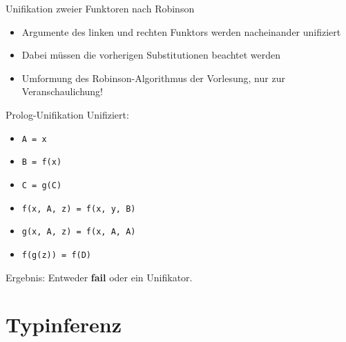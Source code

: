 \documentclass{beamer}
\newcommand{\code}[1]{
	\begin{mdframed}
		
	\end{mdframed}
}
\begin{document}
\begin{frame}{Unifikation zweier Funktoren nach Robinson}
	\code{code/robinson2.pseudo}

	\begin{itemize}
		\item Argumente des linken und rechten Funktors werden nacheinander unifiziert
		\item Dabei müssen die vorherigen Substitutionen beachtet werden
		\pause
		\item Umformung des Robinson-Algorithmus der Vorlesung, nur zur Veranschaulichung!
	\end{itemize}
\end{frame}

\begin{frame}{Prolog-Unifikation}
	Unifiziert:

	\begin{itemize}
		\item \texttt{A = x}
		\item \texttt{B = f(x)}
		\item \texttt{C = g(C)}
		\item \texttt{f(x, A, z) = f(x, y, B)}
		\item \texttt{g(x, A, z) = f(x, A, A)}
		\item \texttt{f(g(z)) = f(D)}
	\end{itemize}

	Ergebnis: Entweder \textbf{fail} oder ein Unifikator.
\end{frame}

\section{Typinferenz}

\newcommand{\aeq}{\stackrel{\alpha}{=}}
\newcommand{\naeq}{\stackrel{\alpha}{\neq}}
\newcommand{\eeq}{\stackrel{\eta}{=}}

\newcommand{\E}{\;}

\newcommand{\liin}[2]{#1\E{}#2}
\newcommand{\liiin}[3]{#1\E{}#2\E{}#3}
\newcommand{\livn}[4]{#1\E{}#2\E{}#3\E{}#4}
\newcommand{\lvn}[5]{#1\E{}#2\E{}#3\E{}#4\E{}#5}

\newcommand{\lii}[2]{(#1\E{}#2)}
\newcommand{\liii}[3]{(#1\E{}#2\E{}#3)}

\newcommand{\liir}[2]{\textcolor{red}{\underline{(}}#1\E{}#2\textcolor{red}{\underline{)}}}
\newcommand{\liiir}[3]{\textcolor{red}{\underline{(}}#1\E{}#2\E{}#3\textcolor{red}{\underline{)}}}

\newcommand{\subst}[3]{(#1)\left[#2\,\to\,#3\right]}
\newcommand{\abs}[2]{\lambda{}#1.#2}
\newcommand{\reducesTo}[1]{\stackrel{#1}{\implies}}
\newcommand{\tikzmark}[3]{\tikz[baseline, remember picture]{
	\node[fill=#1,draw] (#2) {#3};
}}
\end{document}
